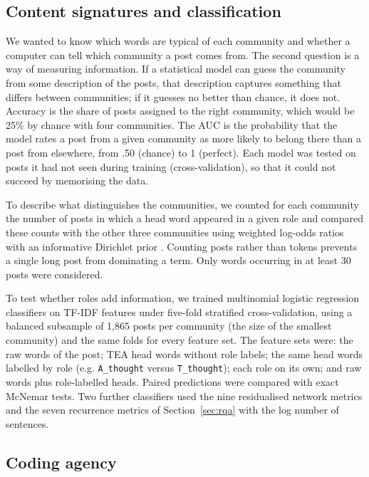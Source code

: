 \documentclass[11pt,a4paper]{article}
\begin{document}
\subsection{Content signatures and classification}\label{sec:content}

We wanted to know which words are typical of each community and whether a computer can tell which community a post comes from. The second question is a way of measuring information. If a statistical model can guess the community from some description of the posts, that description captures something that differs between communities; if it guesses no better than chance, it does not. Accuracy is the share of posts assigned to the right community, which would be 25\% by chance with four communities. The AUC is the probability that the model rates a post from a given community as more likely to belong there than a post from elsewhere, from .50 (chance) to 1 (perfect). Each model was tested on posts it had not seen during training (cross-validation), so that it could not succeed by memorising the data.

To describe what distinguishes the communities, we counted for each community the number of posts in which a head word appeared in a given role and compared these counts with the other three communities using weighted log-odds ratios with an informative Dirichlet prior \citep{monroe2008}. Counting posts rather than tokens prevents a single long post from dominating a term. Only words occurring in at least 30 posts were considered.

To test whether roles add information, we trained multinomial logistic regression classifiers on TF-IDF features under five-fold stratified cross-validation, using a balanced subsample of 1,865 posts per community (the size of the smallest community) and the same folds for every feature set. The feature sets were: the raw words of the post; TEA head words without role labels; the same head words labelled by role (e.g. \texttt{A\_thought} versus \texttt{T\_thought}); each role on its own; and raw words plus role-labelled heads. Paired predictions were compared with exact McNemar tests. Two further classifiers used the nine residualised network metrics and the seven recurrence metrics of Section~\ref{sec:rqa} with the log number of sentences.

\subsection{Coding agency}\label{sec:coding}
\end{document}
